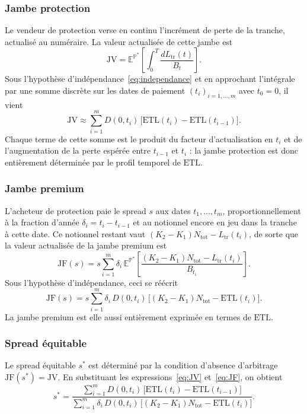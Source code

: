 \subsubsection{Jambe protection}

Le vendeur de protection verse en continu l'incrément de perte de la tranche, actualisé
au numéraire. La valeur actualisée de cette jambe est
\begin{equation}
    \text{JV} = \mathbb{E}^{\mathbb{P}^*}\!\left[\int_0^T \frac{dL_{\text{tr}}(t)}{B_t}\right].
\end{equation}
Sous l'hypothèse d'indépendance~\eqref{eq:independance} et en approchant l'intégrale par une
somme discrète sur les dates de paiement $(t_i)_{i=1,\ldots,m}$ avec $t_0 = 0$, il vient
\begin{equation}
    \text{JV} \approx \sum_{i=1}^m D(0, t_i)\,\bigl[\text{ETL}(t_i) - \text{ETL}(t_{i-1})\bigr].
    \label{eq:JV}
\end{equation}
Chaque terme de cette somme est le produit du facteur d'actualisation en $t_i$ et de
l'augmentation de la perte espérée entre $t_{i-1}$ et $t_i$ : la jambe protection est
donc entièrement déterminée par le profil temporel de $\text{ETL}$.

\subsubsection{Jambe premium}

L'acheteur de protection paie le spread $s$ aux dates $t_1, \ldots, t_m$, proportionnellement
à la fraction d'année $\delta_i = t_i - t_{i-1}$ et au notionnel encore en jeu dans la
tranche à cette date. Ce notionnel restant vaut $(K_2 - K_1)N_{\text{tot}} - L_{\text{tr}}(t_i)$,
de sorte que la valeur actualisée de la jambe premium est
\begin{equation}
    \text{JF}(s) = s \sum_{i=1}^m \delta_i\,\mathbb{E}^{\mathbb{P}^*}\!\left[\frac{(K_2-K_1)N_{\text{tot}} - L_{\text{tr}}(t_i)}{B_{t_i}}\right].
\end{equation}
Sous l'hypothèse d'indépendance, ceci se réécrit
\begin{equation}
    \text{JF}(s) = s \sum_{i=1}^m \delta_i\, D(0, t_i)\,\bigl[(K_2 - K_1)N_{\text{tot}} - \text{ETL}(t_i)\bigr].
    \label{eq:JF}
\end{equation}
La jambe premium est elle aussi entièrement exprimée en termes de $\text{ETL}$.

\subsubsection{Spread équitable}

Le spread équitable $s^*$ est déterminé par la condition d'absence d'arbitrage
$\text{JF}(s^*) = \text{JV}$. En substituant les expressions~\eqref{eq:JV} et~\eqref{eq:JF},
on obtient
\begin{equation}
    s^* = \frac{\displaystyle\sum_{i=1}^m D(0, t_i)\,\bigl[\text{ETL}(t_i) - \text{ETL}(t_{i-1})\bigr]}
               {\displaystyle\sum_{i=1}^m \delta_i\, D(0, t_i)\,\bigl[(K_2 - K_1)N_{\text{tot}} - \text{ETL}(t_i)\bigr]}.
    \label{eq:spread}
\end{equation}

